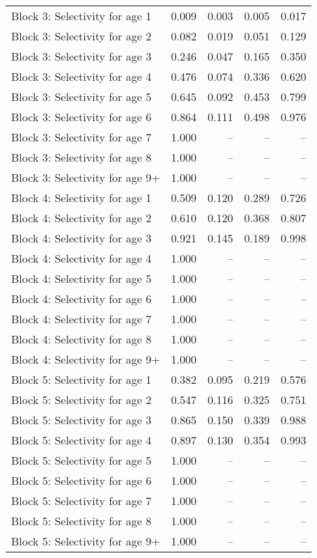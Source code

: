 \documentclass[
]{article}
\begin{document}
\begin{landscape}
\begin{longtable}[t]{lrrrr}
\addlinespace
Block 3: Selectivity for age 1 & 0.009 & 0.003 & 0.005 & 0.017\\
Block 3: Selectivity for age 2 & 0.082 & 0.019 & 0.051 & 0.129\\
Block 3: Selectivity for age 3 & 0.246 & 0.047 & 0.165 & 0.350\\
Block 3: Selectivity for age 4 & 0.476 & 0.074 & 0.336 & 0.620\\
Block 3: Selectivity for age 5 & 0.645 & 0.092 & 0.453 & 0.799\\
\addlinespace
Block 3: Selectivity for age 6 & 0.864 & 0.111 & 0.498 & 0.976\\
Block 3: Selectivity for age 7 & 1.000 & -- & -- & --\\
Block 3: Selectivity for age 8 & 1.000 & -- & -- & --\\
Block 3: Selectivity for age 9+ & 1.000 & -- & -- & --\\
Block 4: Selectivity for age 1 & 0.509 & 0.120 & 0.289 & 0.726\\
\addlinespace
Block 4: Selectivity for age 2 & 0.610 & 0.120 & 0.368 & 0.807\\
Block 4: Selectivity for age 3 & 0.921 & 0.145 & 0.189 & 0.998\\
Block 4: Selectivity for age 4 & 1.000 & -- & -- & --\\
Block 4: Selectivity for age 5 & 1.000 & -- & -- & --\\
Block 4: Selectivity for age 6 & 1.000 & -- & -- & --\\
\addlinespace
Block 4: Selectivity for age 7 & 1.000 & -- & -- & --\\
Block 4: Selectivity for age 8 & 1.000 & -- & -- & --\\
Block 4: Selectivity for age 9+ & 1.000 & -- & -- & --\\
Block 5: Selectivity for age 1 & 0.382 & 0.095 & 0.219 & 0.576\\
Block 5: Selectivity for age 2 & 0.547 & 0.116 & 0.325 & 0.751\\
\addlinespace
Block 5: Selectivity for age 3 & 0.865 & 0.150 & 0.339 & 0.988\\
Block 5: Selectivity for age 4 & 0.897 & 0.130 & 0.354 & 0.993\\
Block 5: Selectivity for age 5 & 1.000 & -- & -- & --\\
Block 5: Selectivity for age 6 & 1.000 & -- & -- & --\\
Block 5: Selectivity for age 7 & 1.000 & -- & -- & --\\
\addlinespace
Block 5: Selectivity for age 8 & 1.000 & -- & -- & --\\
Block 5: Selectivity for age 9+ & 1.000 & -- & -- & --\\*
\end{longtable}
\end{landscape}
\end{document}
